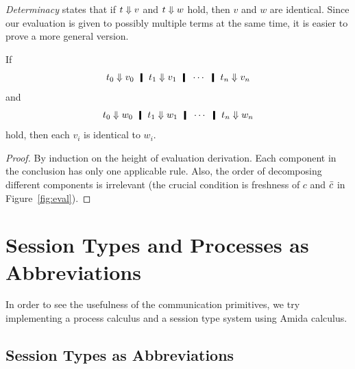   \textit{Determinacy}
  states that if $t\Downarrow v$ and $t\Downarrow w$ hold,
  then $v$ and $w$ are identical.
  Since our evaluation is given to possibly multiple terms at the same
  time, it is easier to prove a more general version.
  \begin{theorem}
   If
   \[
    t_0\eval v_0\hmid t_1\eval v_1\hmid \cdots \hmid t_n\eval v_n
   \]
   and
   \[
    t_0\eval w_0\hmid t_1\eval w_1\hmid \cdots \hmid t_n\eval w_n
   \]
   hold, then each $v_i$ is identical to $w_i$.
  \end{theorem}
  \begin{proof}
   By induction on the height of evaluation derivation.
   Each component in the conclusion has only one applicable rule.
   Also, the order of decomposing different components is irrelevant
   (the crucial
   condition is freshness of $c$ and $\bar{c}$ in Figure~\ref{fig:eval}).
  \end{proof}

  \section{Session Types and Processes as Abbreviations}
  \label{sec:session-process}

    In order to see the usefulness of the communication primitives,
    we try implementing a process calculus and a session type system
    using Amida calculus.

    \subsection{Session Types as Abbreviations}

